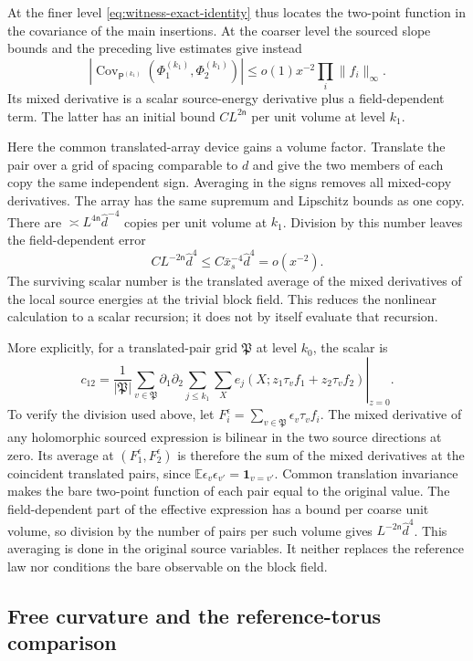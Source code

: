 \documentclass[11pt,letterpaper,reqno]{amsart}
\theoremstyle{definition}
\theoremstyle{remark}
\begin{document}
At the finer level \eqref{eq:witness-exact-identity} thus locates the
two-point function in the covariance of the main insertions. At the
coarser level the sourced slope bounds and the preceding live estimates
give instead
\[
 |\operatorname{Cov}_{\mathsf P^{(k_1)}}
             (\Phi_1^{(k_1)},\Phi_2^{(k_1)})|
             \le o(1)x^{-2}\prod_i\|f_i\|_\infty.
\]
Its mixed derivative is a scalar source-energy derivative plus a
field-dependent term. The latter has an initial bound
$CL^{2\mathsf n}$ per unit volume at level $k_1$.

Here the common translated-array device gains a volume factor. Translate
the pair over a grid of spacing comparable to $d$ and give the two
members of each copy the same independent sign. Averaging in the signs
removes all mixed-copy derivatives. The array has the same supremum
and Lipschitz bounds as one copy. There are
$\asymp L^{4\mathsf n}\hat d^{-4}$ copies per unit volume at
$k_1$. Division by this number leaves the field-dependent error
\[
 CL^{-2\mathsf n}\hat d^4
       \le C\bar x_s^{-4}\hat d^4=o(x^{-2}).
\]
The surviving scalar number is the translated average of the mixed
derivatives of the local source energies at the trivial block field.
This reduces the nonlinear calculation to a scalar recursion; it does
not by itself evaluate that recursion.

More explicitly, for a translated-pair grid $\mathfrak P$ at level
$k_0$, the scalar is
\[
 c_{12}=\frac1{|\mathfrak P|}\sum_{v\in\mathfrak P}
   \left.\partial_1\partial_2
     \sum_{j\le k_1}\sum_X
       e_j(X;z_1\tau_vf_1+z_2\tau_vf_2)\right|_{z=0}.
\]
To verify the division used above, let
$F_i^\epsilon=\sum_{v\in\mathfrak P}\epsilon_v\tau_vf_i$.
The mixed derivative of any holomorphic sourced expression is bilinear
in the two source directions at zero. Its average at
$(F_1^\epsilon,F_2^\epsilon)$ is therefore the sum of the mixed
derivatives at the coincident translated pairs, since
$\mathbb E\epsilon_v\epsilon_{v'}=\mathbf1_{v=v'}$.
Common translation invariance makes the bare two-point function of
each pair equal to the original value. The field-dependent part of
the effective expression has a bound per coarse unit volume, so
division by the number of pairs per such volume gives
$L^{-2\mathsf n}\hat d^4$. This averaging is done in the original
source variables. It neither replaces the reference law nor conditions
the bare observable on the block field.

\subsection{Free curvature and the reference-torus comparison}
\end{document}
